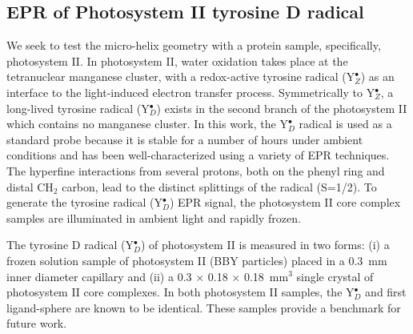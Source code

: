 \subsection{EPR of Photosystem II tyrosine D radical}
We seek to test the micro-helix geometry with a protein sample, specifically, photosystem II. In photosystem II, water oxidation takes place at the tetranuclear manganese cluster, with a redox-active tyrosine radical (Y$_Z^\bullet$) as an interface to the light-induced electron transfer process. \cite{STYRING201276} Symmetrically to Y$_Z^\bullet$, a long-lived tyrosine radical (Y$_D^\bullet$) exists in the second branch of the photosystem II which contains no manganese cluster. In this work, the Y$_D^\bullet$ radical is used as a standard probe because it is stable for a number of hours under ambient conditions\cite{Saito7690} and has been well-characterized using a variety of EPR techniques. \cite{Hofbauer6623, STYRING201276} The hyperfine interactions from several protons, both on the phenyl ring and distal CH$_2$ carbon, lead to the distinct splittings of the radical (S=1/2). To generate the tyrosine radical (Y$_D^\bullet$) EPR signal, the photosystem II core complex samples are illuminated in ambient light and rapidly frozen. 

The tyrosine D radical (Y$_D^\bullet$) of photosystem II is measured in two forms: (i) a frozen solution sample of photosystem II (BBY particles) \cite{BBY1981} placed in a 0.3~mm inner diameter capillary and (ii) a 0.3 $\times$ 0.18 $\times$ 0.18~mm$^3$ single crystal of photosystem II core complexes. \cite{KERN2005147} In both photosystem II samples, the Y$_D^\bullet$ and first ligand-sphere are known to be identical. These samples provide a benchmark for future work.

